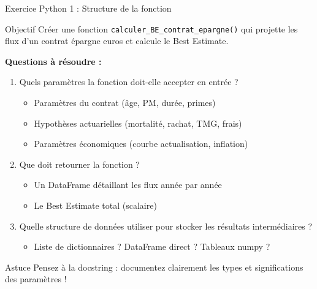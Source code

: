 \documentclass[10pt,aspectratio=169]{beamer}
\begin{document}
\begin{frame}{Exercice Python 1 : Structure de la fonction}
\begin{block}{Objectif}
Créer une fonction \texttt{calculer\_BE\_contrat\_epargne()} qui projette les flux d'un contrat épargne euros et calcule le Best Estimate.
\end{block}

\textbf{Questions à résoudre :}
\begin{enumerate}
    \item Quels paramètres la fonction doit-elle accepter en entrée ?
    \begin{itemize}
        \item Paramètres du contrat (âge, PM, durée, primes)
        \item Hypothèses actuarielles (mortalité, rachat, TMG, frais)
        \item Paramètres économiques (courbe actualisation, inflation)
    \end{itemize}
    
    \item Que doit retourner la fonction ?
    \begin{itemize}
        \item Un DataFrame détaillant les flux année par année
        \item Le Best Estimate total (scalaire)
    \end{itemize}
    
    \item Quelle structure de données utiliser pour stocker les résultats intermédiaires ?
    \begin{itemize}
        \item Liste de dictionnaires ? DataFrame direct ? Tableaux numpy ?
    \end{itemize}
\end{enumerate}

\begin{alertblock}{Astuce}
Pensez à la docstring : documentez clairement les types et significations des paramètres !
\end{alertblock}
\end{frame}
\end{document}

